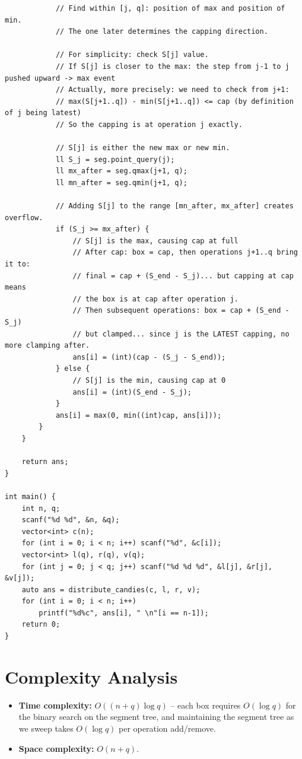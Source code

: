 \documentclass[11pt,a4paper]{article}
\begin{document}
\begin{lstlisting}
            // Find within [j, q]: position of max and position of min.
            // The one later determines the capping direction.

            // For simplicity: check S[j] value.
            // If S[j] is closer to the max: the step from j-1 to j pushed upward -> max event
            // Actually, more precisely: we need to check from j+1:
            // max(S[j+1..q]) - min(S[j+1..q]) <= cap (by definition of j being latest)
            // So the capping is at operation j exactly.

            // S[j] is either the new max or new min.
            ll S_j = seg.point_query(j);
            ll mx_after = seg.qmax(j+1, q);
            ll mn_after = seg.qmin(j+1, q);

            // Adding S[j] to the range [mn_after, mx_after] creates overflow.
            if (S_j >= mx_after) {
                // S[j] is the max, causing cap at full
                // After cap: box = cap, then operations j+1..q bring it to:
                // final = cap + (S_end - S_j)... but capping at cap means
                // the box is at cap after operation j.
                // Then subsequent operations: box = cap + (S_end - S_j)
                // but clamped... since j is the LATEST capping, no more clamping after.
                ans[i] = (int)(cap - (S_j - S_end));
            } else {
                // S[j] is the min, causing cap at 0
                ans[i] = (int)(S_end - S_j);
            }
            ans[i] = max(0, min((int)cap, ans[i]));
        }
    }

    return ans;
}

int main() {
    int n, q;
    scanf("%d %d", &n, &q);
    vector<int> c(n);
    for (int i = 0; i < n; i++) scanf("%d", &c[i]);
    vector<int> l(q), r(q), v(q);
    for (int j = 0; j < q; j++) scanf("%d %d %d", &l[j], &r[j], &v[j]);
    auto ans = distribute_candies(c, l, r, v);
    for (int i = 0; i < n; i++)
        printf("%d%c", ans[i], " \n"[i == n-1]);
    return 0;
}
\end{lstlisting}

\section{Complexity Analysis}
\begin{itemize}
  \item \textbf{Time complexity:} $O((n + q) \log q)$ -- each box requires $O(\log q)$ for the binary search on the segment tree, and maintaining the segment tree as we sweep takes $O(\log q)$ per operation add/remove.
  \item \textbf{Space complexity:} $O(n + q)$.
\end{itemize}
\end{document}
